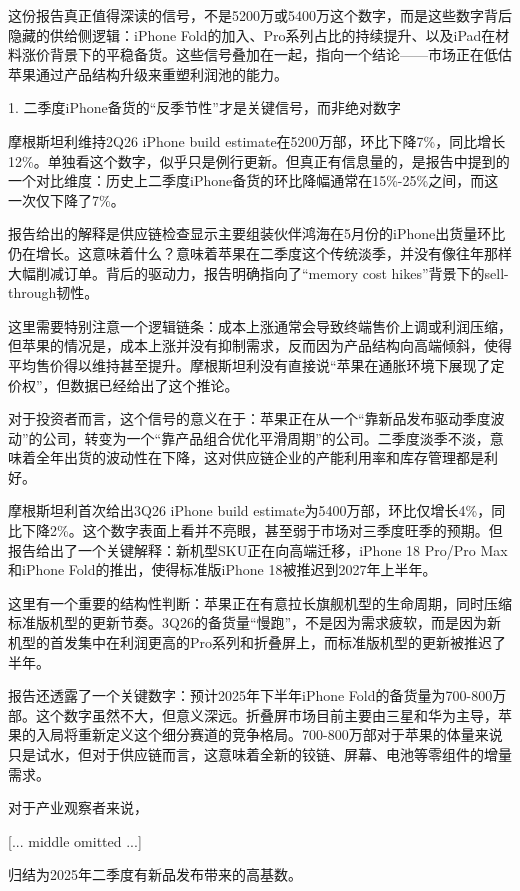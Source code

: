 \documentclass[11pt]{ctexart}
\begin{document}
这份报告真正值得深读的信号，不是5200万或5400万这个数字，而是这些数字背后隐藏的供给侧逻辑：iPhone Fold的加入、Pro系列占比的持续提升、以及iPad在材料涨价背景下的平稳备货。这些信号叠加在一起，指向一个结论——市场正在低估苹果通过产品结构升级来重塑利润池的能力。

1. 二季度iPhone备货的“反季节性”才是关键信号，而非绝对数字

摩根斯坦利维持2Q26 iPhone build estimate在5200万部，环比下降7\%，同比增长12\%。单独看这个数字，似乎只是例行更新。但真正有信息量的，是报告中提到的一个对比维度：历史上二季度iPhone备货的环比降幅通常在15\%-25\%之间，而这一次仅下降了7\%。

报告给出的解释是供应链检查显示主要组装伙伴鸿海在5月份的iPhone出货量环比仍在增长。这意味着什么？意味着苹果在二季度这个传统淡季，并没有像往年那样大幅削减订单。背后的驱动力，报告明确指向了“memory cost hikes”背景下的sell-through韧性。

这里需要特别注意一个逻辑链条：成本上涨通常会导致终端售价上调或利润压缩，但苹果的情况是，成本上涨并没有抑制需求，反而因为产品结构向高端倾斜，使得平均售价得以维持甚至提升。摩根斯坦利没有直接说“苹果在通胀环境下展现了定价权”，但数据已经给出了这个推论。

对于投资者而言，这个信号的意义在于：苹果正在从一个“靠新品发布驱动季度波动”的公司，转变为一个“靠产品组合优化平滑周期”的公司。二季度淡季不淡，意味着全年出货的波动性在下降，这对供应链企业的产能利用率和库存管理都是利好。

摩根斯坦利首次给出3Q26 iPhone build estimate为5400万部，环比仅增长4\%，同比下降2\%。这个数字表面上看并不亮眼，甚至弱于市场对三季度旺季的预期。但报告给出了一个关键解释：新机型SKU正在向高端迁移，iPhone 18 Pro/Pro Max和iPhone Fold的推出，使得标准版iPhone 18被推迟到2027年上半年。

这里有一个重要的结构性判断：苹果正在有意拉长旗舰机型的生命周期，同时压缩标准版机型的更新节奏。3Q26的备货量“慢跑”，不是因为需求疲软，而是因为新机型的首发集中在利润更高的Pro系列和折叠屏上，而标准版机型的更新被推迟了半年。

报告还透露了一个关键数字：预计2025年下半年iPhone Fold的备货量为700-800万部。这个数字虽然不大，但意义深远。折叠屏市场目前主要由三星和华为主导，苹果的入局将重新定义这个细分赛道的竞争格局。700-800万部对于苹果的体量来说只是试水，但对于供应链而言，这意味着全新的铰链、屏幕、电池等零组件的增量需求。

对于产业观察者来说，

[... middle omitted ...]

归结为2025年二季度有新品发布带来的高基数。
\end{document}
